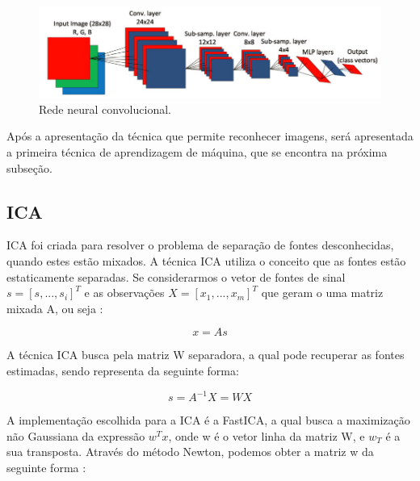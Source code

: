 \begin{figure}[H]
    \caption{Rede neural convolucional.}
    \begin{center}
        \includegraphics[scale=.4]{referencial/img/cnn_image_ince_p5.png}
    \end{center}
    \label{fig:cnn_image_ince_p5}
\end{figure}

Após a apresentação da técnica que permite reconhecer imagens, será apresentada a primeira técnica de aprendizagem de máquina, que se
encontra na próxima subseção.


% 

\subsection{ICA}

ICA foi criada para resolver o problema de separação de fontes desconhecidas, quando estes estão mixados. A técnica ICA utiliza o conceito
que as fontes estão estaticamente separadas. Se considerarmos o vetor de fontes de sinal $s=[s,...,s_i]^T$ e as observações
$X = [x_1,...,x_m]^T$ que geram o uma matriz mixada A, ou seja \cite{Duan2017}:

\begin{equation}\label{eq:ica_1}
    x = As
\end{equation}

A técnica ICA busca pela matriz W separadora, a qual pode recuperar as fontes estimadas, sendo representa da seguinte forma: 

\begin{equation}\label{eq:ica_2}
    s = A^{-1}X = WX
\end{equation}

A implementação escolhida para a ICA é a FastICA, a qual busca a maximização não Gaussiana da expressão $w^Tx$, onde w é o vetor linha
da matriz W, e $w_T$ é a sua transposta. Através do método Newton, podemos obter a matriz w da seguinte forma \cite{Duan2017}:

